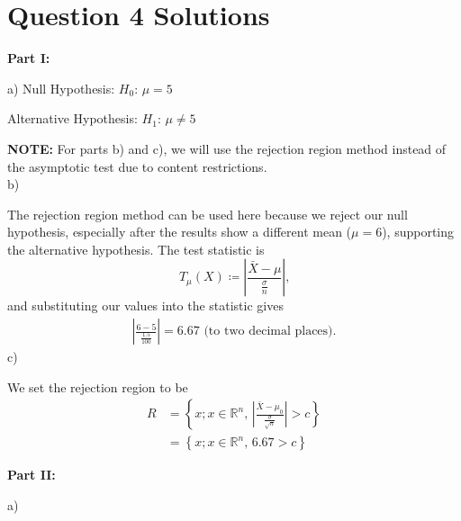 \documentclass{article}
\begin{document}
\section*{Question 4 Solutions} %
\textbf{Part I:}

a)
Null Hypothesis: $H_0\mbox{: }\mu = 5$

Alternative Hypothesis: $H_1\mbox{: }\mu \neq 5$

\textbf{NOTE:} For parts b) and c), we will use the rejection region method instead of the asymptotic test due to content restrictions.\\
b)

The rejection region method can be used here because we reject our null hypothesis, especially after the results show a different mean ($\mu = 6$), supporting the alternative hypothesis. The test statistic is
\[T_{\mu}(X)\coloneqq \left|\frac{\bar{X}-\mu}{\frac{\sigma}{n}}\right|\mbox{,}\]
\hspace*{6mm}and substituting our values into the statistic gives
\begin{align*}
    \left|\frac{6 - 5}{\frac{1.5}{100}}\right| = 6.67\mbox{ (to two decimal places).}
\end{align*}
c)

We set the rejection region to be
\begin{align*}
    R &= \left\{x; x\in\mathbb{R}^n\mbox{, }\left|\frac{\bar{X} - \mu_0}{\frac{\sigma}{\sqrt{n}}}\right| > c\right\}\\
    &= \left\{x; x\in\mathbb{R}^n\mbox{, }6.67 > c\right\}
\end{align*}

\textbf{Part II:}

a)
\end{document}
